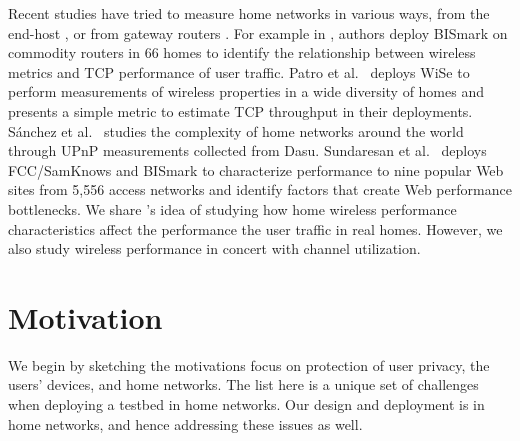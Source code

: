 Recent studies have tried to measure home networks in various ways, from the end-host \cite{chetty2011my,dicioccio2012probe,sanchez2013trying}, or from gateway routers \cite{grover2013peeking,sundaresan2015measuring,patro2013observing,sundaresan2013measuring,pefkianakis2015characterizing}. For example in \cite{sundaresan2015measuring}, authors deploy BISmark on commodity routers in 66 homes to identify the relationship between wireless metrics and TCP performance of user traffic. Patro et al.~\cite{patro2013observing} deploys WiSe to perform measurements of wireless properties in a wide diversity of homes and presents a simple metric to estimate TCP throughput in their deployments. S{\'a}nchez et al.~\cite{sanchez2013trying} studies the complexity of home networks around the world through UPnP measurements collected from Dasu. Sundaresan et al.~\cite{sundaresan2013measuring} deploys FCC/SamKnows and BISmark to characterize performance to nine popular Web sites from 5,556 access networks and identify factors that create Web performance bottlenecks. We share \cite{sundaresan2015measuring}'s idea of studying how home wireless performance characteristics affect the performance the user traffic in real homes. However, we also study wireless performance in concert with channel utilization.

\section{Motivation}
\label{sec.motivation}
We begin by sketching the motivations focus on protection of user privacy, the users' devices, and home networks. The list here is a unique set of challenges when deploying a testbed in home networks. Our design and deployment is in home networks, and hence addressing these issues as well.

